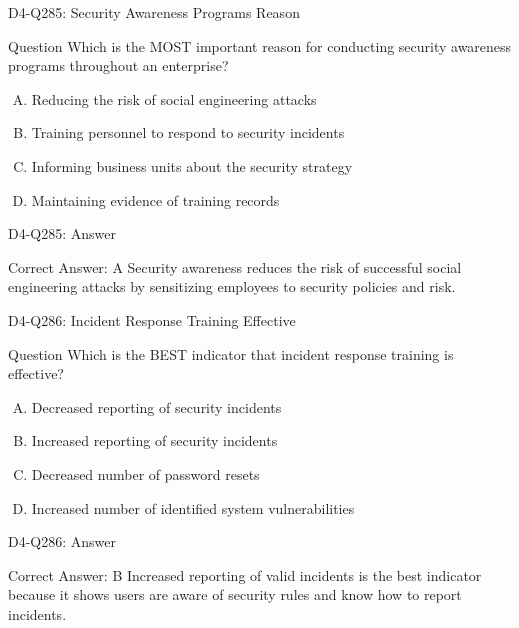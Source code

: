 \documentclass{beamer}
\begin{document}
	\begin{frame}{D4-Q285: Security Awareness Programs Reason}
		\begin{block}{Question}
			Which is the MOST important reason for conducting security awareness programs throughout an enterprise?
		\end{block}
		\begin{enumerate}[(A)]
			\item Reducing the risk of social engineering attacks
			\item Training personnel to respond to security incidents
			\item Informing business units about the security strategy
			\item Maintaining evidence of training records
		\end{enumerate}
	\end{frame}
	\begin{frame}{D4-Q285: Answer}
		\begin{block}{Correct Answer: A}
			Security awareness reduces the risk of successful social engineering attacks by sensitizing employees to security policies and risk.
		\end{block}
	\end{frame}
	
	\begin{frame}{D4-Q286: Incident Response Training Effective}
		\begin{block}{Question}
			Which is the BEST indicator that incident response training is effective?
		\end{block}
		\begin{enumerate}[(A)]
			\item Decreased reporting of security incidents
			\item Increased reporting of security incidents
			\item Decreased number of password resets
			\item Increased number of identified system vulnerabilities
		\end{enumerate}
	\end{frame}
	\begin{frame}{D4-Q286: Answer}
		\begin{block}{Correct Answer: B}
			Increased reporting of valid incidents is the best indicator because it shows users are aware of security rules and know how to report incidents.
		\end{block}
	\end{frame}
	
\end{document}

